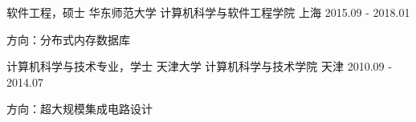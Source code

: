 \begin{cventries}
  \cventry
    {软件工程，硕士}
    {华东师范大学 \quad 计算机科学与软件工程学院}
    {上海}
    {2015.09 - 2018.01}
    {
      \begin{cvitems}
        \item {方向：分布式内存数据库}
      \end{cvitems}
    }
    \cventry
    {计算机科学与技术专业，学士}
    {天津大学 \quad 计算机科学与技术学院}
    {天津}
    {2010.09 - 2014.07}
    {
      \begin{cvitems}
        \item {方向：超大规模集成电路设计}
      \end{cvitems}
    }
\end{cventries}
